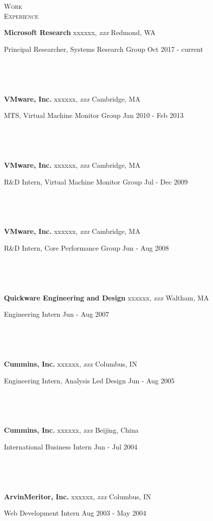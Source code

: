 \documentclass[10pt,times]{report}
\newlength{\sectiongap}
\newlength{\entrygap}
\newlength{\sectioncolwidth}
\newlength{\colgap}
\newlength{\stuffwidth}
\def\ifEqString#1#2{\def\testa{#1}\def\testb{#2}%
  \ifx\testa\testb}
\newenvironment{rtable}{
  \begin{minipage}{\textwidth}
  }{
  \end{minipage}
}
\newenvironment{rentry}[3][xxx]{
  \begin{minipage}[t]{\hsize}
    \textbf{#2}\ifEqString{#1}{xxx}\relax\else, \textit{#1}\fi
    \hspace{\stretch{1}} #3 \\
  }{
    \removelastskip
  \end{minipage}
  \\[\entrygap]  %
}
\newcommand{\rline}[2]{
  \begin{minipage}[t]{\hsize}
    #1 \hspace{\stretch{1}} #2
  \end{minipage} \\
}
\newenvironment{rsection}[1]{
  \begin{minipage}[t]{\sectioncolwidth}
    \textsc{#1}
  \end{minipage}
  \hspace{\colgap}
  \begin{minipage}[t]{\stuffwidth}
  }{
    \removelastskip
  \end{minipage}
  \\[\sectiongap]
}
\begin{document}
\begin{rtable}

  \begin{rsection}{Work\\Experience}
    \begin{rentry}{Microsoft Research}{Redmond, WA}
      \rline{Principal Researcher, Systems Research Group} {Oct 2017 - current}
      \vspace{-.5em}
    \end{rentry}
    \begin{rentry}{VMware, Inc.}{Cambridge, MA}      
      \rline{MTS, Virtual Machine Monitor
        Group}{Jan 2010 - Feb 2013}
      \vspace{-.5em}
    \end{rentry}
    \begin{rentry}{VMware, Inc.}{Cambridge, MA}      
      \rline{R\&D Intern, Virtual Machine Monitor Group}{Jul - Dec 2009}
      \vspace{-.5em}
    \end{rentry}
    \begin{rentry}{VMware, Inc.}{Cambridge, MA}      
      \rline{R\&D Intern, Core Performance Group}{Jun - Aug 2008}
      \vspace{-.5em}
    \end{rentry}
    \begin{rentry}{Quickware Engineering and Design}{Waltham, MA}
      \rline{Engineering Intern}{Jun - Aug 2007} 
      \vspace{-.5em}
    \end{rentry}
    \begin{rentry}{Cummins, Inc.}{Columbus, IN}
      \rline{Engineering Intern, Analysis Led Design}{Jun - Aug 2005}
      \vspace{-.5em}
    \end{rentry}
    \begin{rentry}{Cummins, Inc.}{Beijing, China}
      \rline{International Business Intern}{Jun - Jul 2004} 
      \vspace{-.5em}
    \end{rentry}
    \begin{rentry}{ArvinMeritor, Inc.}{Columbus, IN}
      \rline{Web Development Intern}{Aug 2003 - May 2004}
      \vspace{-.5em}
    \end{rentry}
  \end{rsection}

    

\end{rtable}
\end{document}
